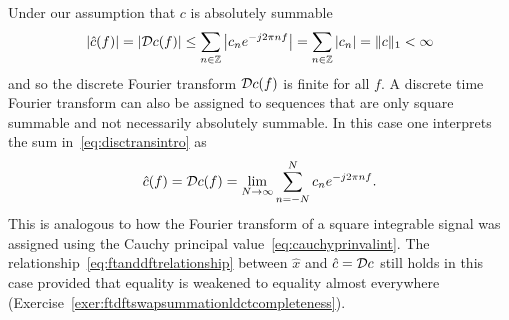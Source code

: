 \clearpage

Under our assumption that $c$ is absolutely summable
\[
\left\vert \hat{c}(f) \right\vert = \left\vert {\mathcal D} c(f) \right\vert \leq \sum_{n \in {\mathbb Z}} \left\vert c_n e^{-j 2\pi n f} \right\vert = \sum_{n \in {\mathbb Z}} \left\vert c_n \right\vert = \|c\|_1 < \infty
\]
and so the discrete Fourier transform ${\mathcal D} c(f)$ is finite for all $f$.  A discrete time Fourier transform can also be assigned to sequences that are only square summable and not necessarily absolutely summable.  In this case one interprets the sum in~\eqref{eq:disctransintro} as
\[
\hat{c}(f) = {\mathcal D} c(f) = \lim_{N \to \infty} \sum_{n = -N}^N c_n e^{-j 2\pi n f}.
\]
This is analogous to how the Fourier transform of a square integrable signal was assigned using the Cauchy principal value~\eqref{eq:cauchyprinvalint}.  The relationship~\eqref{eq:ftanddftrelationship} between $\hat{x}$ and $\hat{c} = {\mathcal D} c$ still holds in this case provided that equality is weakened to equality almost everywhere (Exercise~\ref{exer:ftdftswapsummationldctcompleteness}).  

